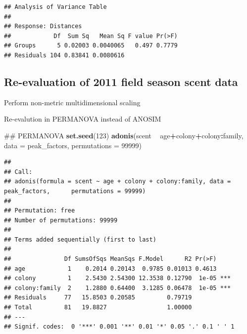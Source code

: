 \documentclass[]{article}
\newenvironment{Shaded}{\begin{snugshade}}{\end{snugshade}}
\newcommand{\KeywordTok}[1]{\textcolor[rgb]{0.13,0.29,0.53}{\textbf{#1}}}
\newcommand{\DataTypeTok}[1]{\textcolor[rgb]{0.13,0.29,0.53}{#1}}
\newcommand{\DecValTok}[1]{\textcolor[rgb]{0.00,0.00,0.81}{#1}}
\newcommand{\StringTok}[1]{\textcolor[rgb]{0.31,0.60,0.02}{#1}}
\newcommand{\CommentTok}[1]{\textcolor[rgb]{0.56,0.35,0.01}{\textit{#1}}}
\newcommand{\OperatorTok}[1]{\textcolor[rgb]{0.81,0.36,0.00}{\textbf{#1}}}
\newcommand{\NormalTok}[1]{#1}
\begin{document}
\begin{verbatim}
## Analysis of Variance Table
## 
## Response: Distances
##            Df  Sum Sq   Mean Sq F value Pr(>F)
## Groups      5 0.02003 0.0040065   0.497 0.7779
## Residuals 104 0.83841 0.0080616
\end{verbatim}

\subsection{Re-evaluation of 2011 field season scent
data}\label{re-evaluation-of-2011-field-season-scent-data}

Perform non-metric multidimensional scaling

Re-evalution in PERMANOVA instead of ANOSIM

\begin{Shaded}
\begin{Highlighting}[]
\NormalTok{## PERMANOVA}
\KeywordTok{set.seed}\NormalTok{(}\DecValTok{123}\NormalTok{)}
\KeywordTok{adonis}\NormalTok{(scent }\OperatorTok{~}\StringTok{ }\NormalTok{age}\OperatorTok{+}\NormalTok{colony}\OperatorTok{+}\NormalTok{colony}\OperatorTok{:}\NormalTok{family, }
       \DataTypeTok{data =}\NormalTok{ peak_factors, }
       \DataTypeTok{permutations =} \DecValTok{99999}\NormalTok{)}
\end{Highlighting}
\end{Shaded}

\begin{verbatim}
## 
## Call:
## adonis(formula = scent ~ age + colony + colony:family, data = peak_factors,      permutations = 99999) 
## 
## Permutation: free
## Number of permutations: 99999
## 
## Terms added sequentially (first to last)
## 
##               Df SumsOfSqs MeanSqs F.Model      R2 Pr(>F)    
## age            1    0.2014 0.20143  0.9785 0.01013 0.4613    
## colony         1    2.5430 2.54300 12.3538 0.12790  1e-05 ***
## colony:family  2    1.2880 0.64400  3.1285 0.06478  1e-05 ***
## Residuals     77   15.8503 0.20585         0.79719           
## Total         81   19.8827                 1.00000           
## ---
## Signif. codes:  0 '***' 0.001 '**' 0.01 '*' 0.05 '.' 0.1 ' ' 1
\end{verbatim}

\begin{Shaded}
\end{Shaded}
\end{document}
